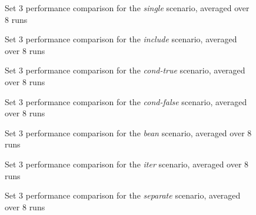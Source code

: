 \begin{figure}[!p]
\centering

\caption{\label{multi:set3-single}Set 3 performance comparison for the \emph{single} scenario, averaged over 8 runs}
\end{figure}

\begin{figure}[!p]
\centering

\caption{\label{multi:set3-include}Set 3 performance comparison for the \emph{include} scenario, averaged over 8 runs}
\end{figure}

\begin{figure}[!p]
\centering

\caption{\label{multi:set3-cond-true}Set 3 performance comparison for the \emph{cond-true} scenario, averaged over 8 runs}
\end{figure}

\begin{figure}[!p]
\centering

\caption{\label{multi:set3-cond-false}Set 3 performance comparison for the \emph{cond-false} scenario, averaged over 8 runs}
\end{figure}

\begin{figure}[!p]
\centering

\caption{\label{multi:set3-bean}Set 3 performance comparison for the \emph{bean} scenario, averaged over 8 runs}
\end{figure}

\begin{figure}[!p]
\centering

\caption{\label{multi:set3-iter}Set 3 performance comparison for the \emph{iter} scenario, averaged over 8 runs}
\end{figure}

\begin{figure}[!p]
\centering

\caption{\label{multi:set3-separate}Set 3 performance comparison for the \emph{separate} scenario, averaged over 8 runs}
\end{figure}

